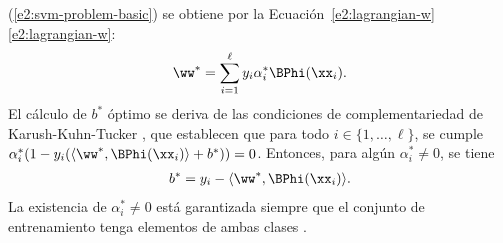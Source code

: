 (\ref{e2:svm-problem-basic}) se obtiene por la
 \iflatexml{}Ecuación~\ref{e2:lagrangian-w}\else\autoref{e2:lagrangian-w}\fi:
%
\begin{align}\label{e2:w-from-alpha}
  \ww^* = \sum_{i=1}^\ell y_i\alpha^*_i\BPhi(\xx_i).
\end{align}
%
El cálculo de $b^*$ óptimo se deriva de las condiciones de
complementariedad de Karush-Kuhn-Tucker \cite{kkt,bottou}, que
establecen que para todo $i\in\{1,\ldots,\ell\}$, se cumple
$\alpha^*_i(1-y_i(\langle\ww^*,\BPhi(\xx_i)\rangle+b^*))=0$. Entonces,
para algún $\alpha^*_i\neq0$, se tiene
%
\begin{align}\label{e2:b-from-alpha}
  b^* = y_i - \langle\ww^*,\BPhi(\xx_i)\rangle .
\end{align}
%
La existencia de $\alpha^*_i\neq0$ está garantizada siempre que el
conjunto de entrenamiento tenga elementos de ambas clases
\cite{glasmachers}.
